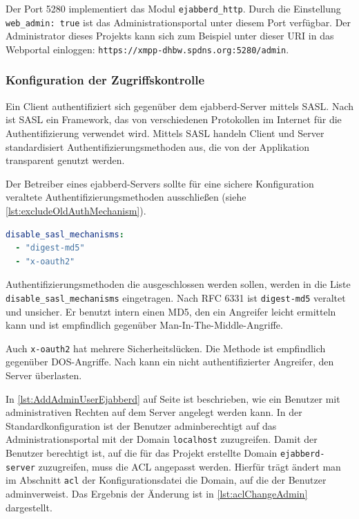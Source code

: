 \documentclass[a4paper,titlepage,halfparskip,12pt]{scrreprt}
\begin{document}
\begin{onehalfspacing}
Der Port 5280 implementiert das Modul \texttt{ejabberd\_http}. Durch die Einstellung \texttt{web\_admin: true} ist das Administrationsportal unter diesem Port verfügbar. Der Administrator dieses Projekts kann sich zum Beispiel unter dieser \ac{URI} in das Webportal einloggen: \texttt{https://xmpp-dhbw.spdns.org:5280/admin}.


\subsubsection*{Konfiguration der Zugriffskontrolle}

Ein Client authentifiziert sich gegenüber dem ejabberd-Server mittels \ac{SASL}. Nach \cite{SASLDescription} ist \ac{SASL} ein Framework, das von verschiedenen Protokollen im Internet für die Authentifizierung verwendet wird. Mittels \ac{SASL} handeln Client und Server standardisiert Authentifizierungsmethoden aus, die von der Applikation transparent genutzt werden.

\pagebreak

Der Betreiber eines ejabberd-Servers sollte für eine sichere Konfiguration veraltete Authentifizierungsmethoden ausschließen (siehe \autoref{lst:excludeOldAuthMechanism}).  

\bigskip

\begin{lstlisting}[language=yaml, caption={Ausschluss unsicherer Authentifizierungsmethoden}, label={lst:excludeOldAuthMechanism}]
disable_sasl_mechanisms:
  - "digest-md5"
  - "x-oauth2"
\end{lstlisting}

Authentifizierungsmethoden die ausgeschlossen werden sollen, werden in die Liste \texttt{disable\_sasl\_mechanisms} eingetragen. Nach \ac{RFC} 6331 ist \texttt{digest-md5} veraltet und unsicher. Er benutzt intern einen \ac{MD5}, den ein Angreifer leicht ermitteln kann und ist empfindlich gegenüber Man-In-The-Middle-Angriffe.\cite{DigestMD5Vulnerabilty}

Auch \texttt{x-oauth2} hat mehrere Sicherheitslücken. Die Methode ist empfindlich gegenüber \ac{DOS}-Angriffe. Nach \cite{xOAuthVulnerabilty} kann ein nicht authentifizierter Angreifer, den Server überlasten.

In \autoref{lst:AddAdminUserEjabberd} auf Seite \pageref{lst:AddAdminUserEjabberd} ist beschrieben, wie ein Benutzer mit administrativen Rechten auf dem Server angelegt werden kann. In der Standardkonfiguration ist der Benutzer \glqq admin\grqq berechtigt auf das Administrationsportal mit der Domain \texttt{localhost} zuzugreifen. Damit der Benutzer berechtigt ist, auf die für das Projekt erstellte Domain \texttt{ejabberd-server} zuzugreifen, muss die \ac{ACL} angepasst werden. Hierfür trägt ändert man im Abschnitt \texttt{acl} der Konfigurationsdatei die Domain, auf die der Benutzer \glqq admin\grqq verweist. Das Ergebnis der Änderung ist in \autoref{lst:aclChangeAdmin} dargestellt.


\end{onehalfspacing}
\end{document}
